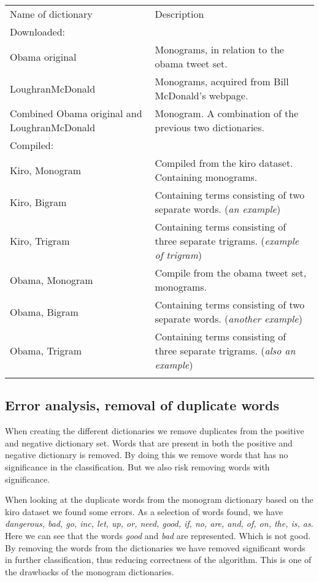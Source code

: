 \begin{tabular}{ p{5cm} p{7cm} }
Name of dictionary & Description \\
Downloaded:& \\
\hline
Obama original & Monograms, in relation to the obama tweet set. \\
LoughranMcDonald & Monograms, acquired from Bill McDonald's webpage.\\
Combined Obama original and LoughranMcDonald & Monogram. A combination of
the previous two dictionaries. \\

Compiled:& \\
\hline
Kiro, Monogram & Compiled from the kiro dataset. Containing
monograms. \\
Kiro, Bigram &  Containing terms consisting of two separate words. (\textit{an 
example}) \\
Kiro, Trigram & Containing terms consisting of three separate trigrams.
(\textit{example of trigram})\\
Obama, Monogram & Compile from the obama tweet set, monograms. \\
Obama, Bigram & Containing terms consisting of two separate words.
(\textit{another example}) \\
Obama, Trigram & Containing terms consisting of three separate trigrams.
(\textit{also an example})\\

	\label{data:dictionary_list}
\end{tabular}
%

\subsection{Error analysis, removal of duplicate words}
When creating the different dictionaries we remove duplicates from the positive
and negative dictionary set. Words that are present in both the positive and
negative dictionary is removed. By doing this we remove words that has no
significance in the classification. But we also risk removing words with
significance.

When looking at the duplicate words from the monogram dictionary based on the
kiro dataset we found some errors.
As a selection of words found, we have \textit{dangerous, bad, go, inc, let, up, or, need, good, if, no, are, and, of, on, the,
is, as}.
Here we can see that the words \textit{good} and \textit{bad} are represented.
Which is not good. By removing the words from the dictionaries we have removed
significant words in further classification, thus reducing correctness of the
algorithm. This is one of the drawbacks of the monogram dictionaries.

